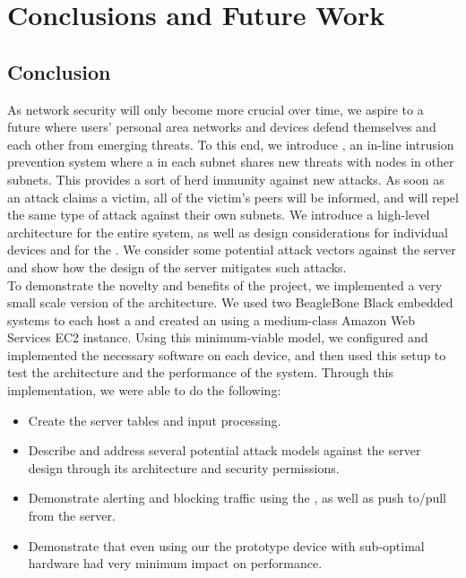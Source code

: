\section{Conclusions and Future Work}
\label{sec:concl}

\subsection{Conclusion}
\label{sec:concl:main}
As network security will only become more crucial over time, we aspire to a future where users' personal area networks and devices defend themselves and each other from emerging threats. To this end, we introduce \sysname, an in-line intrusion prevention system where a \nodename in each subnet shares new threats with nodes in other subnets. This provides a sort of herd immunity against new attacks. As soon as an attack claims a victim, all of the victim's peers will be informed, and will repel the same type of attack against their own subnets. We introduce a high-level architecture for the entire system, as well as design considerations for individual devices and for the \servname. We consider some potential attack vectors against the server and show how the design of the server mitigates such attacks.  \\
To demonstrate the novelty and benefits of the project, we implemented a very small scale version of the architecture. We used two BeagleBone Black embedded systems to each host a \nodename and created an \sysname using a medium-class Amazon Web Services EC2 instance. Using this minimum-viable model, we configured and implemented the necessary software on each device, and then used this setup to test the architecture and the performance of the \sysname system. Through this implementation, we were able to do the following:

\begin{itemize}
    \item Create the \servname server tables and input processing.
    \item Describe and address several potential attack models against the \servname server design through its architecture and security permissions.
    \item Demonstrate alerting and blocking traffic using the \nodename, as well as push to/pull from the \servname server.
    \item Demonstrate that even using our the prototype device with sub-optimal hardware had very minimum impact on performance.
\end{itemize}


